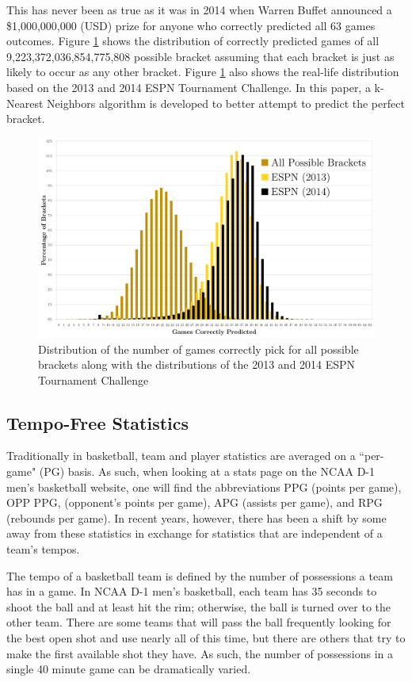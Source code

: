\documentclass[5p, preprint]{elsarticle}
\begin{document}
This has never been as true as it was in 2014 when Warren Buffet announced a \$1,000,000,000 (USD) prize for anyone who correctly predicted all 63 games outcomes. Figure \ref{distro} shows the distribution of correctly predicted games of all 9,223,372,036,854,775,808 possible bracket assuming that each bracket is just as likely to occur as any other bracket. Figure \ref{distro} also shows the real-life distribution based on the 2013 and 2014 ESPN Tournament Challenge. In this paper, a k-Nearest Neighbors algorithm is developed to better attempt to predict the perfect bracket.


\begin{figure}[!t]
\centering
\includegraphics[width=7in]{distro2.png}
\caption{Distribution of the number of games correctly pick for all possible brackets along with the distributions of the 2013 and 2014 ESPN Tournament Challenge}
\label{distro}
\end{figure}

\subsection{Tempo-Free Statistics}

Traditionally in basketball, team and player statistics are averaged on a ``per-game" (PG) basis. As such, when looking at a stats page on the NCAA D-1 men's basketball website, one will find the abbreviations PPG (points per game),  OPP PPG, (opponent's points per game), APG (assists per game), and RPG (rebounds per game).  In recent years, however, there has been a shift by some away from these statistics in exchange for statistics that are independent of a team's tempos. 

The tempo of a basketball team is defined by the number of possessions a team has in a game. In NCAA D-1 men's basketball, each team has 35 seconds to shoot the ball and at least hit the rim; otherwise, the ball is turned over to the other team.  There are some teams that will pass the ball frequently looking for the best open shot and use nearly all of this time, but there are others that try to make the first available shot they have. As such, the number of possessions in a single 40 minute game can be dramatically varied. 
\end{document}
